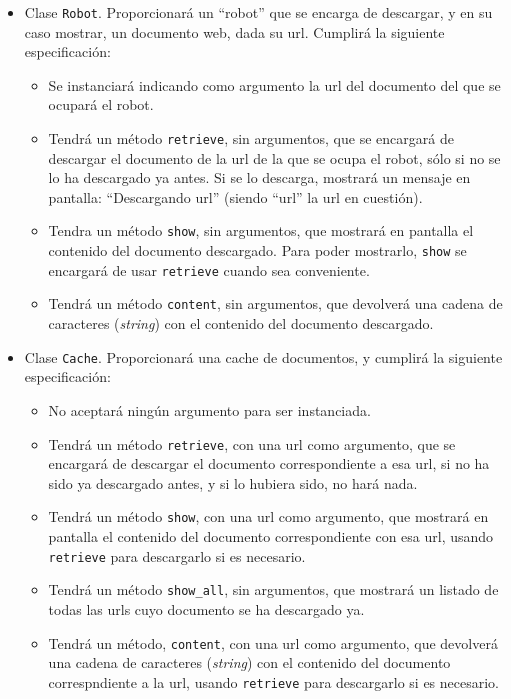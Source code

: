 \begin{itemize}
\item Clase \verb|Robot|. Proporcionará un ``robot'' que se encarga de descargar, y en su caso mostrar, un documento web, dada su url. Cumplirá la siguiente especificación:
  \begin{itemize}
  \item Se instanciará indicando como argumento la url del documento del que se ocupará el robot.
  \item Tendrá un método \verb|retrieve|, sin argumentos, que se encargará de descargar el documento de la url de la que se ocupa el robot, sólo si no se lo ha descargado ya antes. Si se lo descarga, mostrará un mensaje en pantalla: ``Descargando url'' (siendo ``url'' la url en cuestión).
  \item Tendra un método \verb|show|, sin argumentos, que mostrará en pantalla el contenido del documento descargado. Para poder mostrarlo, \verb|show| se encargará de usar \verb|retrieve| cuando sea conveniente.
  \item Tendrá un método \verb|content|, sin argumentos, que devolverá una cadena de caracteres (\emph{string}) con el contenido del documento descargado.
  \end{itemize}
\item Clase \verb|Cache|. Proporcionará una cache de documentos, y cumplirá la siguiente especificación:
  \begin{itemize}
  \item No aceptará ningún argumento para ser instanciada.
  \item Tendrá un método \verb|retrieve|, con una url como argumento, que se encargará de descargar el documento correspondiente a esa url, si no ha sido ya descargado antes, y si lo hubiera sido, no hará nada.
  \item Tendrá un método \verb|show|, con una url como argumento, que mostrará en pantalla el contenido del documento correspondiente con esa url, usando \verb|retrieve| para descargarlo si es necesario.
  \item Tendrá un método \verb|show_all|, sin argumentos, que mostrará un listado de todas las urls cuyo documento se ha descargado ya.
  \item Tendrá un método, \verb|content|, con una url como argumento, que devolverá una cadena de caracteres (\emph{string}) con el contenido del documento correspndiente a la url, usando \verb|retrieve| para descargarlo si es necesario.
  \end{itemize}
\end{itemize}

